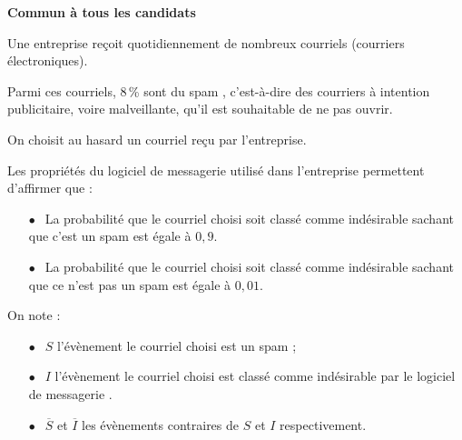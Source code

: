 
\textbf{Commun à tous les candidats}

\medskip

Une entreprise reçoit quotidiennement de nombreux courriels (courriers électroniques).

Parmi ces courriels, 8\,\% sont du \og spam \fg, c'est-à-dire des courriers à intention publicitaire, voire malveillante, qu'il est souhaitable de ne pas ouvrir.

On choisit au hasard un courriel reçu par l'entreprise.

Les propriétés du logiciel de messagerie utilisé dans l'entreprise permettent d'affirmer que :

\setlength\parindent{1cm}
\begin{itemize}
\item[$\bullet~~$]La probabilité que le courriel choisi soit classé comme \og indésirable\fg{} sachant que c'est un spam est égale à $0,9$.
\item[$\bullet~~$]La probabilité que le courriel choisi soit classé comme \og indésirable\fg{} sachant que ce n'est pas un spam est égale à $0,01$.
\end{itemize}
\setlength\parindent{0cm}

On note :

\setlength\parindent{1cm}
\begin{itemize}
\item[$\bullet~~$]$S$ l'évènement \og le courriel choisi est un spam \fg ;
\item[$\bullet~~$]$I$ l'évènement \og le courriel choisi est classé comme indésirable par le logiciel de messagerie \fg.
\item[$\bullet~~$]$\overline{S}$ et $\overline{I}$ les évènements contraires de $S$ et $I$ respectivement.
\end{itemize}
\setlength\parindent{0cm}

\medskip

